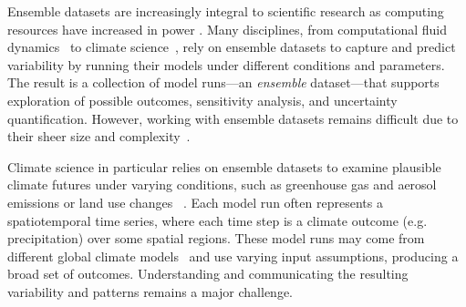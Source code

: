 Ensemble datasets are increasingly integral to scientific research as computing resources have increased in power \cite{wang_visualization_2019, kehrer_visualization_2013}. 
Many disciplines, from computational fluid dynamics~\cite{patchett2017deep} to climate science~\cite{maher2021large}, rely on ensemble datasets to capture and predict variability by running their models under different conditions and parameters.
The result is a collection of model runs---an \textit{ensemble} dataset---that supports exploration of possible outcomes, sensitivity analysis, and uncertainty quantification. However, working with ensemble datasets remains difficult due to their sheer size and complexity~\cite{wang_visualization_2019}.


Climate science in particular relies on ensemble datasets to examine plausible climate futures under varying conditions, such as greenhouse gas and aerosol emissions or land use changes
~\cite{murphy_quantification_2004, eyring2016overview, maher_max_2019}.
%
Each model run often represents  a spatiotemporal time series, where each time step is a climate outcome (e.g. precipitation) over some spatial regions.
%
These model runs may come from different global climate models~\cite{eyring2016overview, maher_max_2019} and use varying input assumptions, producing a broad set of outcomes. Understanding and communicating the resulting variability and patterns remains a major challenge.


